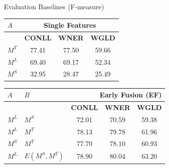 \documentclass[10pt,=table]{beamer}
\newcommand\mlex{M^{\scriptscriptstyle L}}
\newcommand\msyn{M^{\scriptscriptstyle S}}
\newcommand\mstd{M^{\scriptscriptstyle T}}
\begin{document}
\begin{frame}[t]{Evaluation Baselines (F-measure)}
	\begin{minipage}[c][.8\textheight][c]{\linewidth}
		\begin{table}[!tbp]
		\centering
		\begin{tabular}{@{}lccc@{}}
		\toprule
		$A$                           & \multicolumn{3}{c}{\textbf{Single Features}} \\ \midrule
		                & \textbf{CONLL}    & \textbf{WNER}     & \textbf{WGLD}    \\ \cmidrule{2-4}
		$\mstd$                        & 77.41    & 77.50    & 59.66   \\
		$\mlex$                       & 69.40    & 69.17    & 52.34   \\
		$\msyn$                        & 32.95    & 28.47    & 25.49   \\
		 \bottomrule
		\end{tabular}
		\end{table}
		\begin{table}
		\centering
		\begin{tabular}{@{}llccc@{}}
				\toprule
				    $A$      &    $B$       & \multicolumn{3}{r}{\textbf{Early Fusion (EF)} }                                            \\ \midrule
				          &           & \textbf{CONLL}                      & \textbf{WNER}                      & \textbf{WGLD}                      \\ \cmidrule{3-5}
				          
				$\mlex$ & $\msyn$ & 72.01                      & 70.59                     & 59.38                     \\
				$\mlex$ & $\mstd$ & 78.13                      & 79.78                     & 61.96                     \\
				$\msyn$ & $\mstd$ & 77.70                      & 78.10                     & 60.93                     \\
				\rowcolor{orangeEric}
				$\mlex$ & $E(M^S, M^T)$ & {78.90}                      & {80.04}                     & {63.20}                   \\ \bottomrule
		\end{tabular}
		\end{table}
	\end{minipage}
\end{frame}
\end{document}
